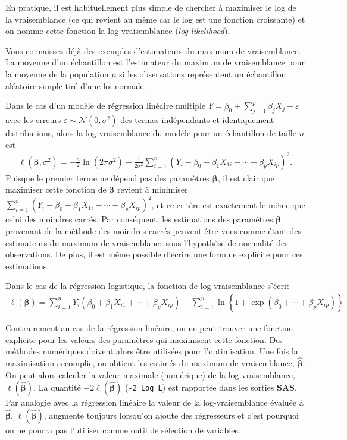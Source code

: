 \documentclass[
  11pt,
  letterpaper,
]{book}
\theoremstyle{definition}
\theoremstyle{definition}
\theoremstyle{definition}
\theoremstyle{remark}
\begin{document}
En pratique, il est habituellement plus simple de chercher à maximiser le log de la vraisemblance (ce qui revient au même car le log est une fonction croissante) et on nomme cette fonction la log-vraisemblance (\emph{log-likelihood}).

Vous connaissez déjà des exemples d'estimateurs du maximum de vraisemblance. La moyenne d'un échantillon est l'estimateur du maximum de vraisemblance pour la moyenne de la population \(\mu\) si les observations représentent un échantillon aléatoire simple tiré d'une loi normale.

Dans le cas d'un modèle de régression linéaire multiple \(Y = \beta_0 + \sum_{j=1}^p \beta_jX_j + \varepsilon\) avec les erreurs \(\varepsilon\sim \mathcal{N}(0, \sigma^2)\) des termes indépendants et identiquement distributions, alors la log-vraisemblance du modèle pour un échantillon de taille \(n\) est
\begin{align*}
 \ell(\boldsymbol{\beta}, \sigma^2) =- \frac{n}{2} \ln(2\pi\sigma^2) - \frac{1}{2\sigma^2}\sum_{i=1}^n (Y_i- \beta_0 - \beta_1 X_{1i} - \cdots - \beta_pX_{ip})^2.
\end{align*}
Puisque le premier terme ne dépend pas des paramètres \(\boldsymbol{\beta}\), il est clair que maximiser cette fonction de \(\boldsymbol{\beta}\) revient à minimiser \(\sum_{i=1}^n (Y_i- \beta_0 - \beta_1 X_{1i} - \cdots - \beta_pX_{ip})^2\), et ce critère est exactement le même que celui des moindres carrés. Par conséquent, les estimations des paramètres \(\boldsymbol{\beta}\) provenant de la méthode des moindres carrés peuvent être vues comme étant des estimateurs du maximum de vraisemblance sous l'hypothèse de normalité des observations. De plus, il est même possible d'écrire une formule explicite pour ces estimations.

Dans le cas de la régression logistique, la fonction de log-vraisemblance s'écrit
\begin{align*}
 \ell(\boldsymbol{\beta}) = \sum_{i=1}^n Y_i ( \beta_0 + \beta_1 X_{i1} + \cdots + \beta_p X_{ip}) - \sum_{i=1}^n \ln\left\{1+\exp(\beta_0 + \cdots + \beta_pX_{ip})\right\}
\end{align*}

Contrairement au cas de la régression linéaire, on ne peut trouver une fonction explicite pour les valeurs des paramètres qui maximisent cette fonction. Des méthodes numériques doivent alors être utilisées pour l'optimisation. Une fois la maximisation accomplie, on obtient les estimés du maximum de vraisemblance, \(\widehat{\boldsymbol{\beta}}\). On peut alors calculer la valeur maximale (numérique) de la log-vraisemblance, \(\ell(\widehat{\boldsymbol{\beta}})\). La quantité \(-2\ell(\widehat{\boldsymbol{\beta}})\) (\texttt{-2\ Log\ L}) est rapportée dans les sorties \textbf{SAS}. Par analogie avec la régression linéaire la valeur de la log-vraisemblance évaluée à \(\widehat{\boldsymbol{\beta}}\), \(\ell(\widehat{\boldsymbol{\beta}})\), augmente toujours lorsqu'on ajoute des régresseurs et c'est pourquoi on ne pourra pas l'utiliser comme outil de sélection de variables.
\end{document}
